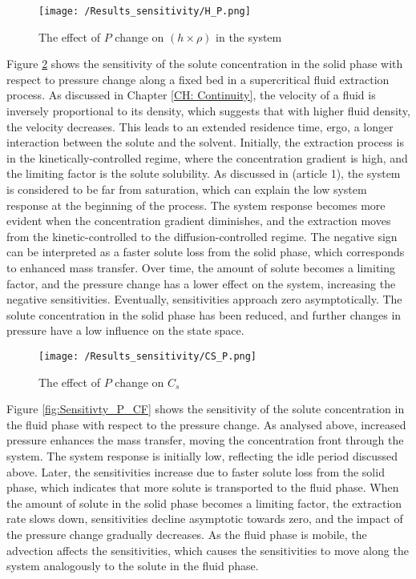 \documentclass[../Article_Sensitivity_Analsysis.tex]{subfiles}
\begin{document}
	\begin{figure}[h!]
		\centering
		\texttt{[image: /Results\_sensitivity/H\_P.png]}
		\caption{The effect of $P$ change on $(h \times \rho)$ in the system}
		\label{fig:Sensitivty_P_H}
	\end{figure}
	
	Figure \ref{fig:Sensitivty_P_CS} shows the sensitivity of the solute concentration in the solid phase with respect to pressure change along a fixed bed in a supercritical fluid extraction process. As discussed in Chapter \ref{CH: Continuity}, the velocity of a fluid is inversely proportional to its density, which suggests that with higher fluid density, the velocity decreases. This leads to an extended residence time, ergo, a longer interaction between the solute and the solvent. Initially, the extraction process is in the kinetically-controlled regime, where the concentration gradient is high, and the limiting factor is the solute solubility. As discussed in ({\color{red}article 1}), the system is considered to be far from saturation, which can explain the low system response at the beginning of the process. The system response becomes more evident when the concentration gradient diminishes, and the extraction moves from the kinetic-controlled to the diffusion-controlled regime. The negative sign can be interpreted as a faster solute loss from the solid phase, which corresponds to enhanced mass transfer. Over time, the amount of solute becomes a limiting factor, and the pressure change has a lower effect on the system, increasing the negative sensitivities. Eventually, sensitivities approach zero asymptotically. The solute concentration in the solid phase has been reduced, and further changes in pressure have a low influence on the state space.

	\begin{figure}[h!]
		\centering
		\texttt{[image: /Results\_sensitivity/CS\_P.png]}
		\caption{The effect of $P$ change on $C_s$}
		\label{fig:Sensitivty_P_CS}
	\end{figure}
	
	Figure \ref{fig:Sensitivty_P_CF} shows the sensitivity of the solute concentration in the fluid phase with respect to the pressure change. As analysed above, increased pressure enhances the mass transfer, moving the concentration front through the system. The system response is initially low, reflecting the idle period discussed above. Later, the sensitivities increase due to faster solute loss from the solid phase, which indicates that more solute is transported to the fluid phase. When the amount of solute in the solid phase becomes a limiting factor, the extraction rate slows down, sensitivities decline asymptotic towards zero, and the impact of the pressure change gradually decreases. As the fluid phase is mobile, the advection affects the sensitivities, which causes the sensitivities to move along the system analogously to the solute in the fluid phase.
	
\end{document}
